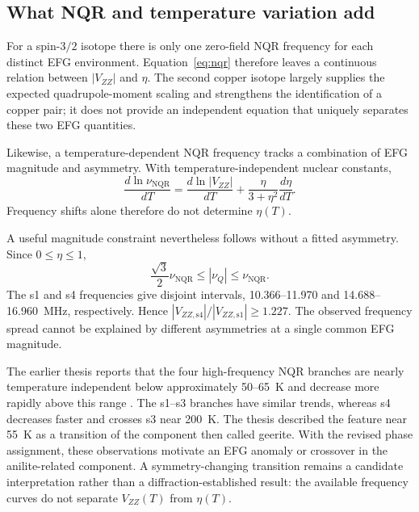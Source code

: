 \documentclass[10pt,a4paper,twocolumn]{article}
\newcommand{\nqr}{\mathrm{NQR}}
\begin{document}




\subsection{What NQR and temperature variation add}

For a spin-$3/2$ isotope there is only one zero-field NQR frequency for each distinct EFG environment. Equation~\eqref{eq:nqr} therefore leaves a continuous relation between $|V_{ZZ}|$ and $\eta$. The second copper isotope largely supplies the expected quadrupole-moment scaling and strengthens the identification of a copper pair; it does not provide an independent equation that uniquely separates these two EFG quantities.

Likewise, a temperature-dependent NQR frequency tracks a combination of EFG magnitude and asymmetry. With temperature-independent nuclear constants,
\begin{equation}
\frac{d\ln\nu_{\nqr}}{dT}
=\frac{d\ln|V_{ZZ}|}{dT}
+\frac{\eta}{3+\eta^2}\frac{d\eta}{dT}.
\label{eq:temperature}
\end{equation}
Frequency shifts alone therefore do not determine $\eta(T)$.

A useful magnitude constraint nevertheless follows without a fitted asymmetry. Since $0\leq\eta\leq1$,
\begin{equation}
\frac{\sqrt{3}}{2}\nu_{\nqr}\leq|\nu_Q|\leq\nu_{\nqr}.
\label{eq:nqrbound}
\end{equation}
The s1 and s4 frequencies give disjoint intervals, 10.366--11.970 and 14.688--16.960~MHz, respectively. Hence $|V_{ZZ,\mathrm{s4}}|/|V_{ZZ,\mathrm{s1}}|\geq1.227$. The observed frequency spread cannot be explained by different asymmetries at a single common EFG magnitude.

The earlier thesis reports that the four high-frequency NQR branches are nearly temperature independent below approximately 50--65~K and decrease more rapidly above this range \citep[pp.~23--24]{Evlampiev2009}. The s1--s3 branches have similar trends, whereas s4 decreases faster and crosses s3 near 200~K. The thesis described the feature near 55~K as a transition of the component then called geerite. With the revised phase assignment, these observations motivate an EFG anomaly or crossover in the anilite-related component. A symmetry-changing transition remains a candidate interpretation rather than a diffraction-established result: the available frequency curves do not separate $V_{ZZ}(T)$ from $\eta(T)$.
\end{document}
